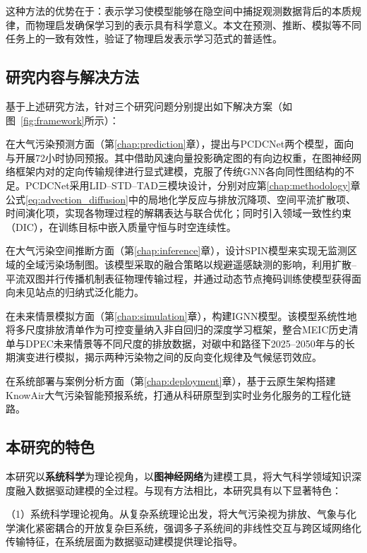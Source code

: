 这种方法的优势在于：表示学习使模型能够在隐空间中捕捉观测数据背后的本质规律，而物理启发确保学习到的表示具有科学意义。本文在预测、推断、模拟等不同任务上的一致有效性，验证了物理启发表示学习范式的普适性。

\subsection{研究内容与解决方法}
\label{subsec:contributions_chap1}

基于上述研究方法，针对三个研究问题分别提出如下解决方案（如图~\ref{fig:framework}所示）：

在大气污染预测方面（第\ref{chap:prediction}章），提出\ModelPred{}与PCDCNet两个模型，面向\PM 与\ozone 开展72小时协同预报。其中\ModelPred{}借助风速向量投影确定图的有向边权重，在图神经网络框架内对的定向传输规律进行显式建模，克服了传统GNN各向同性图结构的不足。PCDCNet采用LID--STD--TAD三模块设计，分别对应第\ref{chap:methodology}章公式\eqref{eq:advection_diffusion}中的局地化学反应与排放沉降项、空间平流扩散项、时间演化项，实现各物理过程的解耦表达与联合优化；同时引入领域一致性约束（DIC），在训练目标中嵌入质量守恒与时空连续性。

在大气污染空间推断方面（第\ref{chap:inference}章），设计SPIN模型来实现无监测区域的全域污染场制图。该模型采取的融合策略以规避遥感缺测的影响，利用扩散--平流双图并行传播机制表征物理传输过程，并通过动态节点掩码训练使模型获得面向未见站点的归纳式泛化能力。

在未来情景模拟方面（第\ref{chap:simulation}章），构建IGNN模型。该模型系统性地将多尺度排放清单作为可控变量纳入非自回归的深度学习框架，整合MEIC历史清单与DPEC未来情景等不同尺度的排放数据，对碳中和路径下2025--2050年\PM 与\ozone 的长期演变进行模拟，揭示两种污染物之间的反向变化规律及气候惩罚效应。

在系统部署与案例分析方面（第\ref{chap:deployment}章），基于云原生架构搭建KnowAir大气污染智能预报系统，打通从科研原型到实时业务化服务的工程化链路。

\subsection{本研究的特色}
\label{subsec:characteristics}

本研究以\textbf{系统科学}为理论视角，以\textbf{图神经网络}为建模工具，将大气科学领域知识深度融入数据驱动建模的全过程。与现有方法相比，本研究具有以下显著特色：

（1）系统科学理论视角。从复杂系统理论出发，将大气污染视为排放、气象与化学演化紧密耦合的开放复杂巨系统，强调多子系统间的非线性交互与跨区域网络化传输特征，在系统层面为数据驱动建模提供理论指导。

